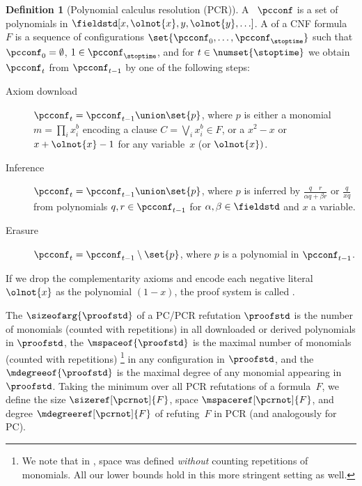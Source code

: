 \documentclass[11pt]{article}
\numberwithin{equation}{section}
\theoremstyle{definition}
\newtheorem{definition}[theorem]{Definition}
\theoremstyle{plain}
\begin{document}
\begin{definition}[Polynomial calculus resolution (PCR)]
  \label{def:sequential-refutation}
  A ~$\pcconf$ is a set of
%
  polynomials 
  in
%
  $\fieldstd[x, \olnot{x}, y, \olnot{y}, \ldots]$.
  A 
   of a CNF formula~$F$
  is a
  sequence of configurations $\set{\pcconf_0, \ldots,
    \pcconf_\stoptime}$ such that $\pcconf_0 = \emptyset$, $1 \in
  \pcconf_{\stoptime}$, and
  for $t \in \numset{\stoptime}$
  we obtain
  $\pcconf_t$
  from $\pcconf_{t-1}$ by one of the following steps:
  \begin{description}
  \item[Axiom download] $\pcconf_t = \pcconf_{t-1} \union \set{p}$,
    where $p$ is either 
    a %
    monomial 
    $m = \prod_i x_i^b$
    encoding 
    a %
    clause
    $C=\bigvee_i x_i^b \in F$,
    or
    a  $x^2 - x$ 
    or
     $x + \olnot{x} - 1$
    for any variable~$x$ (or $\olnot{x})$.
  \item[Inference] $\pcconf_t = \pcconf_{t - 1} \union \set{p}$, where
    $p$ is 
%
%
%
%
%
%
%
%
%
    inferred by 
     $\frac{q \quad r}{\alpha q + \beta r}$
    or
     $\frac{q}{x q}$
    from  polynomials $q, r \in \pcconf_{t - 1}$ 
    for $\alpha, \beta \in \fieldstd$ and $x$ a variable.
  \item[Erasure] $\pcconf_t = \pcconf_{t - 1} \setminus \set{p}$,
    where $p$ is a polynomial in $\pcconf_{t - 1}$.
  \end{description}
  If we drop
  the  %
  complementarity axioms and encode each negative literal
  $\olnot{x}$ as the polynomial $(1 - x)$, the proof system is called
  . 

  The  $\sizeofarg{\proofstd}$ of a
  PC/PCR refutation $\proofstd$ is the number of monomials (counted
  with repetitions) in all downloaded or derived polynomials in
  $\proofstd$, the 
  $\mspaceof{\proofstd}$ is the maximal number of monomials (counted
  with repetitions)%
  \footnote{%
    We note that in
      \cite{ABRW02SpaceComplexity},
      space was defined \emph{without} counting repetitions of monomials. 
      All our lower bounds hold in this more stringent setting as well.}
  in any configuration in $\proofstd$, and the
   $\mdegreeof{\proofstd}$ is the maximal degree
  of any monomial appearing in $\proofstd$.  Taking the minimum over
  all PCR refutations of a formula~$F$, we define the size
  $\sizeref[\pcrnot]{F}$, space $\mspaceref[\pcrnot]{F}$, and degree
  $\mdegreeref[\pcrnot]{F}$ of refuting~$F$ in PCR
  (and analogously for PC).
\end{definition}
\end{document}
